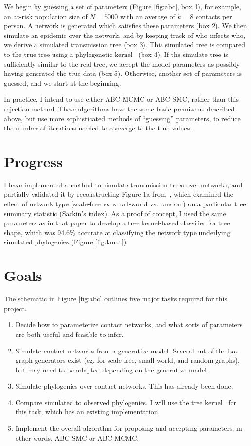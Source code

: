 \documentclass{article}
\begin{document}
We begin by guessing a set of parameters (Figure \ref{fig:abc}, box 1), for
example, an at-risk population size of $N = 5000$ with an average of $k = 8$
contacts per person.  A network is generated which satisfies these parameters
(box 2). We then simulate an epidemic over the network, and by keeping track of
who infects who, we derive a simulated transmission tree (box 3). This
simulated tree is compared to the true tree using a phylogenetic
kernel~\cite{poon2013mapping} (box 4). If the simulate tree is sufficiently
similar to the real tree, we accept the model parameters as possibly having
generated the true data (box 5). Otherwise, another set of parameters is
guessed, and we start at the beginning.

In practice, I intend to use either ABC-MCMC or ABC-SMC, rather than this
rejection method. These algorithms have the same basic premise as described
above, but use more sophisticated methods of ``guessing'' parameters, to reduce
the number of iterations needed to converge to the true values.

\section{Progress}

I have implemented a method to simulate transmission trees over networks, and
partially validated it by reconstructing Figure 1a
from~\cite{leventhal2012inferring}, which examined the effect of network type
(scale-free vs. small-world vs. random) on a particular tree summary statistic
(Sackin's index). As a proof of concept, I used the same parameters as in that
paper to develop a tree kernel-based classifier for tree shape, which was
94.6\% accurate at classifying the network type underlying simulated
phylogenies (Figure \ref{fig:kmat}).

\section{Goals}

The schematic in Figure \ref{fig:abc} outlines five major tasks required for
this project.

\begin{enumerate}
    \item Decide how to parameterize contact networks, and what sorts of
        parameters are both useful and feasible to infer.
    \item Simulate contact networks from a generative model. Several
        out-of-the-box graph generators exist (eg. for scale-free, small-world,
        and random graphs), but may need to be adapted depending on the
        generative model.
    \item Simulate phylogenies over contact networks. This has already been
        done.
    \item Compare simulated to observed phylogenies. I will use the tree
        kernel~\cite{poon2013mapping} for this task, which has an existing
        implementation.
    \item Implement the overall algorithm for proposing and accepting
        parameters, in other words, ABC-SMC or ABC-MCMC.
\end{enumerate}
\end{document}
